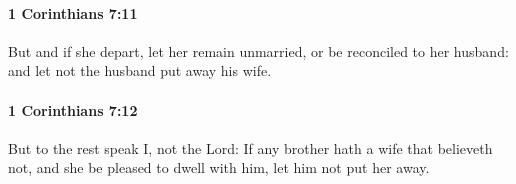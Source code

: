 		\paragraph{1 Corinthians 7:11} %
			\label{1CORINTHIANS-7-11}

			But and if she depart, let her remain unmarried, or be reconciled to her husband: and let not the husband put away his wife.

			\begin{framed}
			\scriptsize
				\begin{compactdesc}
					\item[SBLG] 
				\end{compactdesc}
			\end{framed}

		\paragraph{1 Corinthians 7:12} %
			\label{1CORINTHIANS-7-12}

			But to the rest speak I, not the Lord: If any brother hath a wife that believeth not, and she be pleased to dwell with him, let him not put her away.

